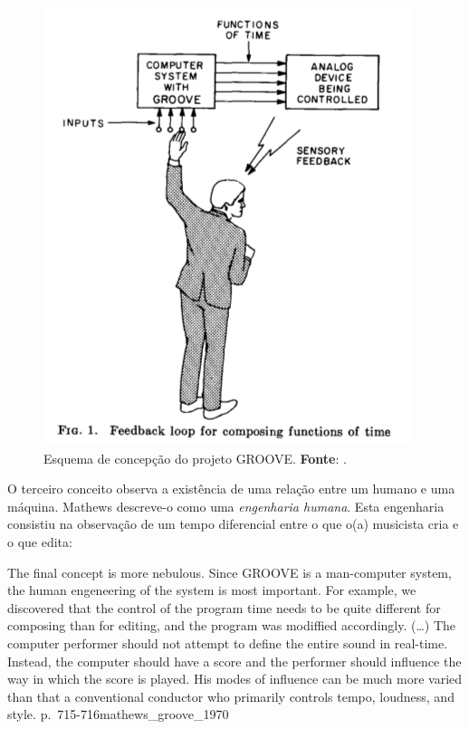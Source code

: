 \begin{figure}
\begin{center}
\includegraphics[scale=0.618]{./imagens/GROOVE.png}
\caption{Esquema de concepção do projeto GROOVE. \textbf{Fonte}: \cite{mathews_groove_1970}.}
\label{fig:groove_sistema}
\end{center}
\end{figure} 

O terceiro conceito observa a existência de uma relação entre um humano e uma máquina. Mathews descreve-o como uma \emph{engenharia humana}. Esta engenharia consistiu na observação de um tempo diferencial entre o que o(a) musicista cria e o que edita:

{
The final concept is more nebulous. Since GROOVE is a man-computer system, the human engeneering of the system is most important. For example, we discovered that the control of the program time needs to be quite different for composing than for editing, and the program was modiffied accordingly. (\ldots) The computer performer should not attempt to define the entire sound in real-time. Instead, the computer should have a score and the performer should influence the way in which the score is played. His modes of influence can be much more varied than that a conventional conductor who primarily controls tempo, loudness, and style.
}
{p.~715-716}{mathews_groove_1970}

